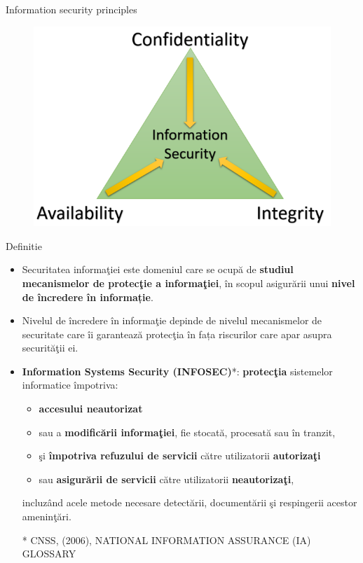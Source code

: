 \documentclass[pdf]{beamer}
\begin{document}
\begin{frame}{Information security principles}
\begin{figure}[t]
\centering
\includegraphics[scale=0.75]{Images/CIA_Triad}
\end{figure}
\end{frame}



\begin{frame}{Definitie}
\begin{itemize}
\item
Securitatea informaţiei este domeniul care se ocupă de \textbf{studiul mecanismelor de protecţie a informaţiei}, în scopul asigurării unui \textbf{nivel de încredere în informație}. 

\item
Nivelul de încredere în informaţie depinde de nivelul mecanismelor de securitate care îi garantează protecţia în fața riscurilor care apar asupra securităţii ei. 

\item
\textbf{Information Systems Security (INFOSEC)}*: \textbf{protecţia }sistemelor informatice împotriva:
\begin{itemize}
\item
\textbf{accesului neautorizat }
\item
sau a \textbf{modificării informaţiei}, fie stocată, procesată sau în tranzit, 
\item
şi \textbf{împotriva refuzului de servicii} către utilizatorii \textbf{autorizaţi }
\item
sau \textbf{asigurării de servicii }către utilizatorii \textbf{neautorizaţi}, 
\end{itemize}
incluzând acele metode necesare detectării, documentării şi respingerii acestor ameninţări.

* CNSS, (2006), NATIONAL INFORMATION ASSURANCE (IA) GLOSSARY
\end{itemize}
\end{frame}
\end{document}
